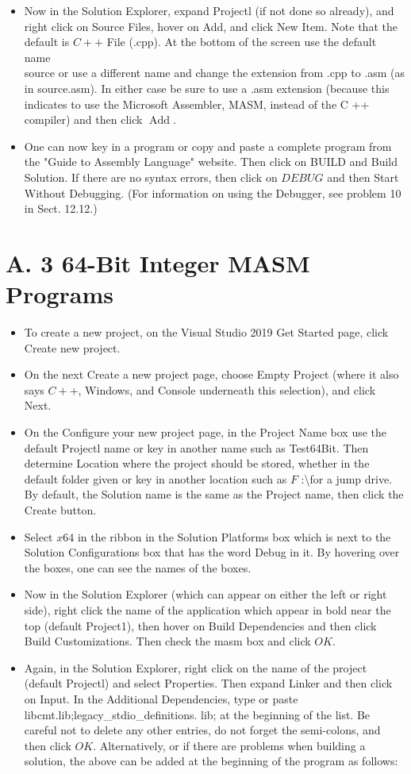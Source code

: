 \documentclass[10pt]{book}
\begin{document}
\begin{itemize}
  \item Now in the Solution Explorer, expand Projectl (if not done so already), and right click on Source Files, hover on Add, and click New Item. Note that the default is $C++$ File (.cpp). At the bottom of the screen use the default name\\
source or use a different name and change the extension from .cpp to .asm (as in source.asm). In either case be sure to use a .asm extension (because this indicates to use the Microsoft Assembler, MASM, instead of the C ++ compiler) and then click $\operatorname{Add}$.
  \item One can now key in a program or copy and paste a complete program from the "Guide to Assembly Language" website. Then click on BUILD and Build Solution. If there are no syntax errors, then click on $D E B U G$ and then Start Without Debugging. (For information on using the Debugger, see problem 10 in Sect. 12.12.)
\end{itemize}

\section{A. 3 64-Bit Integer MASM Programs}
\begin{itemize}
  \item To create a new project, on the Visual Studio 2019 Get Started page, click Create new project.
  \item On the next Create a new project page, choose Empty Project (where it also says $C++$, Windows, and Console underneath this selection), and click Next.
  \item On the Configure your new project page, in the Project Name box use the default Projectl name or key in another name such as Test64Bit. Then determine Location where the project should be stored, whether in the default folder given or key in another location such as $F$ :\textbackslash for a jump drive. By default, the Solution name is the same as the Project name, then click the Create button.
  \item Select $x 64$ in the ribbon in the Solution Platforms box which is next to the Solution Configurations box that has the word Debug in it. By hovering over the boxes, one can see the names of the boxes.
  \item Now in the Solution Explorer (which can appear on either the left or right side), right click the name of the application which appear in bold near the top (default Project1), then hover on Build Dependencies and then click Build Customizations. Then check the masm box and click $O K$.
  \item Again, in the Solution Explorer, right click on the name of the project (default Projectl) and select Properties. Then expand Linker and then click on Input. In the Additional Dependencies, type or paste libcmt.lib;legacy\_stdio\_definitions. lib; at the beginning of the list. Be careful not to delete any other entries, do not forget the semi-colons, and then click $O K$. Alternatively, or if there are problems when building a solution, the above can be added at the beginning of the program as follows:
\end{itemize}
\end{document}

